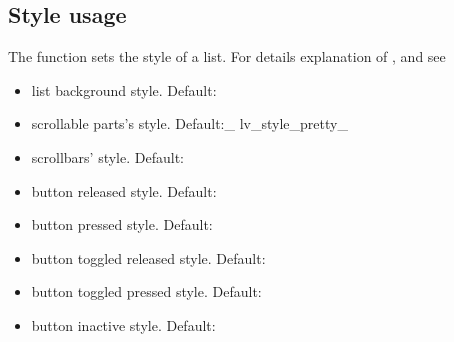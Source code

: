 \documentclass[letterpaper,10pt,english]{sphinxmanual}
\begin{document}
\subsection{Style usage}
\label{\detokenize{object-types/list:style-usage}}
The  function sets the style of a list. For details explanation of ,  and  see 
\begin{itemize}
\item {} 
 list background style. Default: 

\item {} 
 scrollable parts’s style. Default:\_ lv\_style\_pretty\_

\item {} 
 scrollbars’ style. Default: 

\item {} 
 button released style. Default: 

\item {} 
 button pressed style. Default: 

\item {} 
 button toggled released style. Default: 

\item {} 
 button toggled pressed style. Default: 

\item {} 
 button inactive style. Default: 

\end{itemize}
\end{document}
